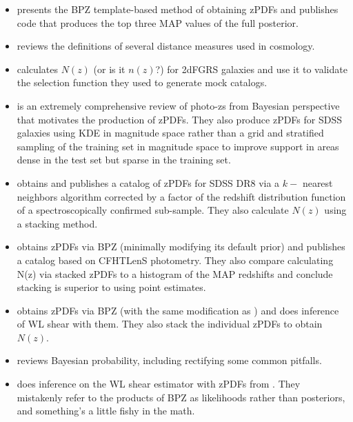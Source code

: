 \documentclass[preprint]{aastex}
\begin{document}
\begin{itemize}
\item \citet{ben98} presents the BPZ template-based method of obtaining zPDFs and publishes code that produces the top three MAP values of the full posterior.  
\item \citet{hog99} reviews the definitions of several distance measures used in cosmology.
\item \citet{nor01} calculates $N(z)$ (or is it $n(z)$?) for 2dFGRS galaxies and use it to validate the selection function they used to generate mock catalogs.
\item \citet{bud08} is an extremely comprehensive review of photo-zs from Bayesian perspective that motivates the production of zPDFs. They also produce zPDFs for SDSS galaxies using KDE in magnitude space rather than a grid and stratified sampling of the training set in magnitude space to improve support in areas dense in the test set but sparse in the training set.
\item \citet{she11} obtains and publishes a catalog of zPDFs for SDSS DR8 via a $k-$ nearest neighbors algorithm corrected by a factor of the redshift distribution function of a spectroscopically confirmed sub-sample.  They also calculate $N(z)$ using a stacking method.
\item \citet{hil11} obtains zPDFs via BPZ (minimally modifying its default prior) and publishes a catalog based on CFHTLenS photometry.  They also compare calculating N(z) via stacked zPDFs to a histogram of the MAP redshifts and conclude stacking is superior to using point estimates.
\item \citet{kel12} obtains zPDFs via BPZ (with the same modification as \citet{hil11}) and does inference of WL shear with them.  They also stack the individual zPDFs to obtain $N(z)$.
\item \citet{hog12} reviews Bayesian probability, including rectifying some common pitfalls.
\item \citet{app12} does inference on the WL shear estimator with zPDFs from \citet{kel12}.  They mistakenly refer to the products of BPZ as likelihoods rather than posteriors, and something's a little fishy in the math.

\end{itemize}
\end{document}
